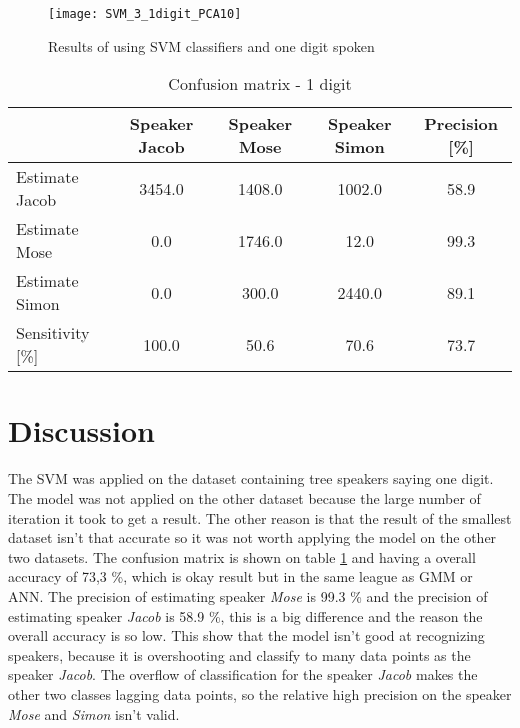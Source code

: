 \begin{figure}[H]
\centering
\texttt{[image: SVM\_3\_1digit\_PCA10]}
\caption{Results of using SVM classifiers and one digit spoken}
\label{fig:SVM3_1dig_PCA}
\end{figure}

\begin{table}[H]                                                    
\centering                                                          
\begin{tabular}{|l|c|c|c|c|}                                        
\hline                                                              
  & Speaker Jacob & Speaker Mose & Speaker Simon & Precision [\%] \\
\hline                                                              
Estimate Jacob & 3454.0 & 1408.0 & 1002.0 & 58.9 \\                 
\hline                                                              
Estimate Mose & 0.0 & 1746.0 & 12.0 & 99.3 \\                       
\hline                                                              
Estimate Simon & 0.0 & 300.0 & 2440.0 & 89.1 \\                     
\hline                                                              
Sensitivity [\%] & 100.0 & 50.6 & 70.6 & 73.7 \\                    
\hline                                                              
\end{tabular}                                                       
\caption{Confusion matrix - 1 digit}                                
\label{table:SVM_3_conf_1}                                          
\end{table} 


\section{Discussion}
The SVM was applied on the dataset containing tree speakers saying one digit.
The model was not applied on the other dataset because the large number of iteration it took to get a result.
The other reason is that the result of the smallest dataset isn't that accurate so it was not worth applying the model on the other two datasets.   
The confusion matrix is shown on table \ref{table:SVM_3_conf_1} and having a overall accuracy of 73,3 \%, which is okay result but in the same league as GMM or ANN. 
The precision of estimating speaker \textit{Mose} is 99.3 \% and the precision of estimating speaker \textit{Jacob} is 58.9 \%, this is a big difference and the reason the overall accuracy is so low.
This show that the model isn't good at recognizing speakers, because it is overshooting and classify to many data points as the speaker \textit{Jacob}.
The overflow of classification for the speaker \textit{Jacob} makes the other two classes lagging data points, so the relative high precision on the speaker \textit{Mose} and \textit{Simon} isn't valid.  



